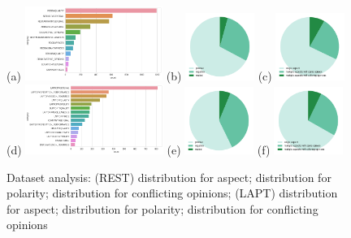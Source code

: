 \begin{figure}
\centering
\subfigure(a){
\label{fig:A1a}
\includegraphics[width=0.4\textwidth]{images/anal_asp_REST.png}}
\hspace{8pt}
\subfigure(b){
\label{fig:A1b}
\includegraphics[width=0.2\textwidth]{images/anal_pol_REST.png}} 
\hspace{8pt}
\subfigure(c){
\label{fig:A1c}
\includegraphics[width=0.2\textwidth]{images/anal_asp-pol_REST.png}} 
\\
\subfigure(d){
\label{fig:A1e}
\includegraphics[width=0.4\textwidth]{images/anal_asp_LAPT.png}}
\hspace{8pt}
\subfigure(e){
\label{fig:A1e}
\includegraphics[width=0.2\textwidth]{images/anal_pol_LAPT.png}}
\hspace{8pt}
\subfigure(f){
\label{fig:A1f}
\includegraphics[width=0.2\textwidth]{images/anal_asp-pol_LAPT.png}} 
\caption{Dataset analysis: (REST)
 distribution for aspect;
 distribution for polarity;
 distribution for conflicting opinions; (LAPT)
 distribution for aspect;
 distribution for polarity;
 distribution for conflicting opinions}
\label{fig:A1}
\end{figure}